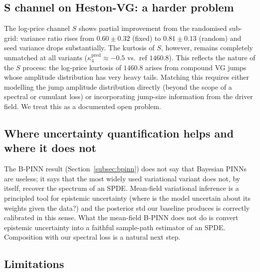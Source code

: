 \documentclass[review,12pt]{elsarticle}
\begin{document}
\subsection{S channel on Heston-VG: a harder problem}

The log-price channel \(S\) shows partial improvement from the
randomised sub-grid: variance ratio rises from \(0.60 \pm 0.32\)
(fixed) to \(0.81 \pm 0.13\) (random) and seed variance drops
substantially. The kurtosis of \(S\), however, remains completely
unmatched at all variants (\(\kappa_4^{\mathrm{pred}} \approx -0.5\)
vs.\ ref \(1460.8\)). This reflects the nature of the \(S\)
process: the log-price kurtosis of \(1460.8\) arises from
compound VG jumps whose amplitude distribution has very heavy tails.
Matching this requires either modelling the jump amplitude
distribution directly (beyond the scope of a spectral or cumulant
loss) or incorporating jump-size information from the driver field.
We treat this as a documented open problem.

\subsection{Where uncertainty quantification helps and where it does not}

The B-PINN result (Section~\ref{subsec:bpinn}) does not say that
Bayesian PINNs are useless; it says that the most widely used
variational variant does not, by itself, recover the spectrum of
an SPDE. Mean-field variational inference is a principled tool for
epistemic uncertainty (where is the model uncertain about its
weights given the data?) and the posterior std our baseline
produces is correctly calibrated in this sense. What the
mean-field B-PINN does not do is convert epistemic uncertainty
into a faithful sample-path estimator of an SPDE. Composition with
our spectral loss is a natural next step.

\subsection{Limitations}
\end{document}
